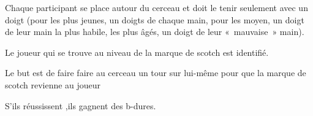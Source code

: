 \documentclass{grand-jeu}
\begin{document}
\begin{liste-materiel}
\end{liste-materiel}

\begin{regles}
Chaque participant se place autour du cerceau et doit le tenir seulement avec un doigt (pour les plus jeunes, un doigts de chaque main, pour les moyen, un doigt de leur main la plus habile, les plus âgés, un doigt de leur « mauvaise » main). 

Le joueur qui se trouve au niveau de la marque de scotch est identifié. 

Le but est de faire faire au cerceau un tour sur lui-même pour que la marque de scotch revienne au joueur

S'ils réussissent ,ils gagnent des b-dures.
\end{regles}

\begin{moments-stop}
\end{moments-stop}
\end{document}
